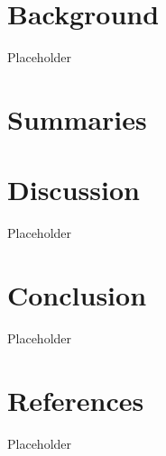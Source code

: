 \documentclass[acmsmall,screen]{acmart}
\begin{document}
\section{Background}
Placeholder

\section{Summaries}
\subsection{}
\subsection{}
\subsection{}

\section{Discussion}
Placeholder


\section{Conclusion}
Placeholder


\section{References}
Placeholder



\end{document}
